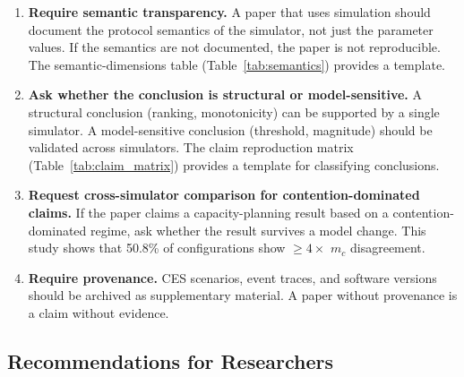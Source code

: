 \documentclass[aps,prapplied,reprint,superscriptaddress]{revtex4-2}
\begin{document}
\begin{enumerate}[leftmargin=2em]
\item \textbf{Require semantic transparency.} A paper that uses simulation should document the protocol semantics of the simulator, not just the parameter values. If the semantics are not documented, the paper is not reproducible. The semantic-dimensions table (Table~\ref{tab:semantics}) provides a template.

\item \textbf{Ask whether the conclusion is structural or model-sensitive.} A structural conclusion (ranking, monotonicity) can be supported by a single simulator. A model-sensitive conclusion (threshold, magnitude) should be validated across simulators. The claim reproduction matrix (Table~\ref{tab:claim_matrix}) provides a template for classifying conclusions.

\item \textbf{Request cross-simulator comparison for contention-dominated claims.} If the paper claims a capacity-planning result based on a contention-dominated regime, ask whether the result survives a model change. This study shows that 50.8\% of configurations show $\geq 4\times$ $m_c$ disagreement.

\item \textbf{Require provenance.} CES scenarios, event traces, and software versions should be archived as supplementary material. A paper without provenance is a claim without evidence.
\end{enumerate}

\subsection{Recommendations for Researchers}
\end{document}
